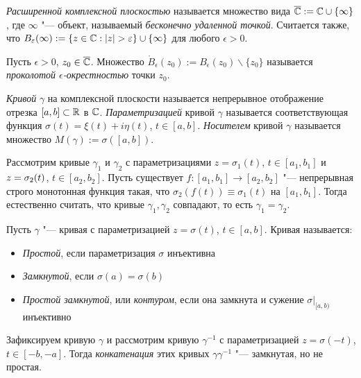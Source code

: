 \begin{definition}
	\textit{Расширенной комплексной плоскостью} называется множество вида $\overline{\mathbb{C}} := \mathbb{C} \cup \{\infty\}$, где $\infty$ "--- объект, называемый \textit{бесконечно удаленной точкой}. \pagebreak Считается также, что $B_{\varepsilon}(\infty) := \{z \in \mathbb{C}: |z| > \varepsilon\} \cup \{\infty\}$ для любого $\epsilon > 0$.
\end{definition}

\begin{definition}
	Пусть $\epsilon > 0$, $z_0 \in \overline{\mathbb{C}}$. Множество $\mathring B_\epsilon(z_0) := B_\epsilon(z_0) \backslash \{z_0\}$ называется \textit{проколотой $\epsilon$-окрестностью} точки $z_0$.
\end{definition}

\begin{definition}
	\textit{Кривой} $\gamma$ на комплексной плоскости называется непрерывное отображение отрезка $[a, b] \subset \mathbb{R}$ в $\mathbb{C}$. \textit{Параметризацией} кривой $\gamma$ называется соответствующая 	функция $\sigma(t) = \xi(t) + i\eta(t)$, $t \in [a, b]$. \textit{Носителем} кривой $\gamma$ называется множество $M(\gamma) := \sigma([a, b])$. 
\end{definition}

\begin{note}
	Рассмотрим кривые $\gamma_1$ и $\gamma_2$ с параметризациями $z = \sigma_1(t)$, $t \in [a_1, b_1]$ и $z \hm= \sigma_2(t)$, $t \in [a_2, b_2]$. Пусть существует $f : [a_1, b_1] \to [a_2, b_2]$ "--- непрерывная строго монотонная функция такая, что $\sigma_2(f(t)) \equiv \sigma_1(t)$ на $[a_1, b_1]$. Тогда естественно считать, что кривые $\gamma_1, \gamma_2$ совпадают, то есть $\gamma_1 = \gamma_2$.
\end{note}

\begin{definition}
	Пусть $\gamma$ "--- кривая с параметризацией $z = \sigma(t)$, $t \in [a, b]$. Кривая называется:
	\begin{itemize}
		\item \textit{Простой}, если параметризация $\sigma$ инъективна
		\item \textit{Замкнутой}, если $\sigma(a) = \sigma(b)$
		\item \textit{Простой замкнутой}, или \textit{контуром}, если она замкнута и сужение $\sigma|_{[a, b)}$ инъективно
	\end{itemize}
\end{definition}

\begin{example}
	Зафиксируем кривую $\gamma$ и рассмотрим кривую $\gamma^{-1}$ с параметризацией $z = \sigma(-t)$, $t \in [-b, -a]$. Тогда \textit{конкатенация} этих кривых $\gamma\gamma^{-1}$ "--- замкнутая, но не простая.
\end{example}

